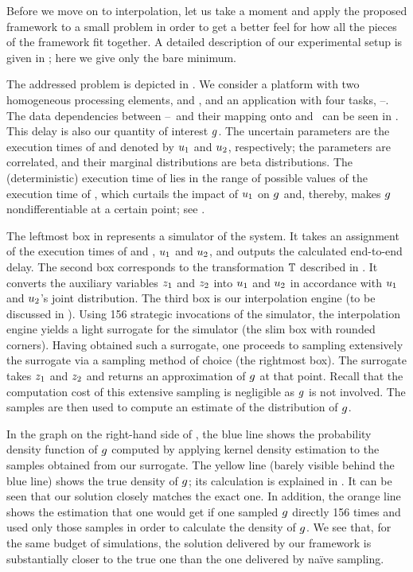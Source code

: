 Before we move on to interpolation, let us take a moment and apply the proposed
framework to a small problem in order to get a better feel for how all the
pieces of the framework fit together. A detailed description of our experimental
setup is given in ; here we give only the bare minimum.

\newcommand{\cores}{\token{PE1} and \token{PE2}}
\newcommand{\tasks}{\token{T1}--\token{T4}}
The addressed problem is depicted in . We consider a platform with
two homogeneous processing elements, \cores, and an application with four tasks,
\tasks. The data dependencies between \tasks\ and their mapping onto \cores\ can
be seen in . This delay is also our quantity of interest $g$. The
uncertain parameters are the execution times of  and 
denoted by $u_1$ and $u_2$, respectively; the parameters are correlated, and
their marginal distributions are beta distributions. The (deterministic)
execution time of  lies in the range of possible values of the
execution time of , which curtails the impact of $u_1$ on $g$ and,
thereby, makes $g$ nondifferentiable at a certain point; see .

The leftmost box in  represents a simulator of the system. It
takes an assignment of the execution times of  and , $u_1$
and $u_2$, and outputs the calculated end-to-end delay. The second box
corresponds to the transformation $\mathbb{T}$ described in
. It converts the auxiliary variables $z_1$ and $z_2$ into
$u_1$ and $u_2$ in accordance with $u_1$ and $u_2$'s joint distribution. The
third box is our interpolation engine (to be discussed in ).
Using 156 strategic invocations of the simulator, the interpolation engine
yields a light surrogate for the simulator (the slim box with rounded corners).
Having obtained such a surrogate, one proceeds to sampling extensively the
surrogate via a sampling method of choice (the rightmost box). The surrogate
takes $z_1$ and $z_2$ and returns an approximation of $g$ at that point.
Recall that the computation cost of this extensive sampling is negligible as
$g$ is not involved. The samples are then used to compute an estimate of the
distribution of $g$.

In the graph on the right-hand side of , the blue line shows the
probability density function of $g$ computed by applying kernel density
estimation to the samples obtained from our surrogate. The yellow line (barely
visible behind the blue line) shows the true density of $g$; its calculation is
explained in . It can be seen that our solution closely
matches the exact one. In addition, the orange line shows the estimation that
one would get if one sampled $g$ directly 156 times and used only those samples
in order to calculate the density of $g$. We see that, for the same budget of
simulations, the solution delivered by our framework is substantially closer to
the true one than the one delivered by na\"{i}ve sampling.
